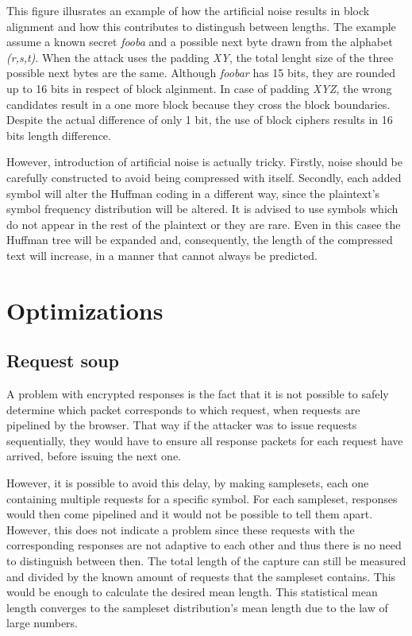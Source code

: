 This figure illusrates an example of how the artificial noise results in block alignment and 
how this contributes to distingush between lengths. The example assume a known secret
\textit{fooba} and a possible next byte drawn from the alphabet \textit{(r,s,t)}.
When the attack uses the padding \textit{XY}, the total lenght size 
of the three possible next bytes are the same. Although \textit{foobar} has 15 bits,
they are rounded up to 16 bits in respect of block alginment.
In case of padding \textit{XYZ}, the wrong candidates result in a one more block 
because they cross the block boundaries. Despite the actual difference of only 1 bit,
the use of block ciphers results in 16 bits length difference.


However, introduction of artificial noise is actually tricky. Firstly, noise should be carefully constructed
to avoid being compressed with itself. Secondly, each added symbol will alter the Huffman coding in a
different way, since the plaintext's symbol frequency distribution will be altered. It is advised to use symbols
which do not appear in the rest of the plaintext or they are rare. Even in this casee
 the Huffman tree will be expanded and, consequently, the length of the compressed text will increase,
 in a manner that cannot always be predicted.

\section{Optimizations}\label{sec:optimizations}


\subsection{Request soup}\label{subsec:soup}

A problem with encrypted responses is the fact that it is not possible to safely
determine which packet corresponds to which request, when requests are pipelined
by the browser. That way if the attacker was to issue
requests sequentially, they would have to ensure all response packets for each request
have arrived, before issuing the next one.

However, it is possible to avoid this delay, by making samplesets, each one containing multiple
requests for a specific symbol. For each sampleset, responses would then come pipelined and it
would not be possible to tell them apart. However, this does not indicate a problem since these requests
with the corresponding responses are not adaptive to each other and thus there is no
need to distinguish between then. The total length of the capture can still be
measured and divided by the known amount of requests that the sampleset
contains. This would be enough to calculate the desired mean length.
This statistical mean length converges to the sampleset distribution's mean length due to
the law of large numbers.

